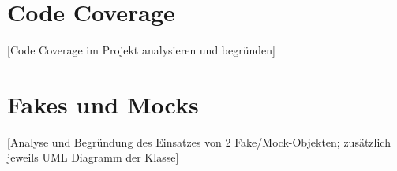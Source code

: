 \section{Code Coverage}
[Code Coverage im Projekt analysieren und begründen]

\section{Fakes und Mocks}
[Analyse und Begründung des Einsatzes von 2 Fake/Mock-Objekten; zusätzlich jeweils UML Diagramm der Klasse]